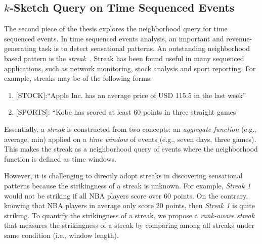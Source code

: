 \subsection{$k$-Sketch Query on Time Sequenced Events}
The second piece of the thesis explores the neighborhood
query for time sequenced events. 
In time sequenced events analysis, an important
and revenue-generating task is to detect sensational patterns.
An outstanding neighborhood based pattern is the \emph{streak}~\cite{zhang2014discovering}. 
Streak has been found useful in many sequenced applications,
such as network monitoring, stock analysis
and sport reporting. For example, streaks may be of the following forms:
\begin{enumerate}
	\item{[STOCK]:``Apple Inc. has an average price of USD 115.5 in the last week''}
	\item{[SPORTS]: ``Kobe has scored at least 60 points in three straight games' }
\end{enumerate}
Essentially, a \emph{streak} is constructed from two concepts: an \emph{aggregate function} (e.g., average, min)
applied on a \emph{time window} of events (e.g., seven days, three games).
%
This makes the streak as a neighborhood query of events where the neighborhood function is defined as time windows.
%

However, it is challenging to directly adopt streaks in discovering sensational patterns because
the strikingness of a streak is unknown.
For example, \emph{Streak 1} would not be striking if all NBA players score over 60 points. 
On the contrary, knowing that NBA players in average only score 20 points, then \emph{Streak 1} is quite striking. 
To quantify the strikingness of a streak, we propose a \emph{rank-aware streak} that measures the strikingness of
a streak by comparing among all streaks under same condition (i.e., window length).


